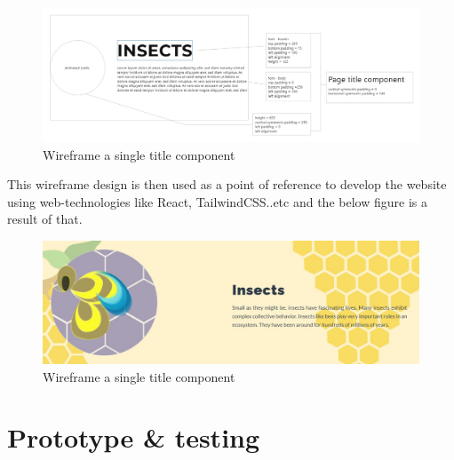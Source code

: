 \begin{figure}[h]
	\begin{center}
		\includegraphics[scale=0.3]{Figures/wireframe-1.JPG}
		\caption{Wireframe a single title component}
		\label{fig:rb}
	\end{center}
\end{figure}

This wireframe design is then used as a point of reference to develop the website using web-technologies like React, TailwindCSS..etc and the below figure is a result of that.

\begin{figure}[h]
	\begin{center}
		\includegraphics[scale=0.3]{Figures/insects-title.JPG}
		\caption{Wireframe a single title component}
		\label{fig:rb}
	\end{center}
\end{figure}


\section{Prototype \& testing}





